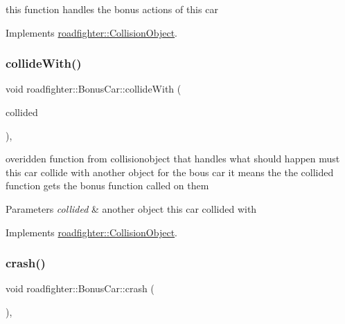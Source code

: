 this function handles the bonus actions of this car 

Implements \hyperlink{classroadfighter_1_1CollisionObject_a157e499c27619ceefd6179a459fafd90}{roadfighter\+::\+Collision\+Object}.

\mbox{\label{classroadfighter_1_1BonusCar_ad1ce65b53e5652eac482a7b00c9a1d51}} 
\subsubsection{\texorpdfstring{collide\+With()}{collideWith()}}
{\footnotesize\ttfamily void roadfighter\+::\+Bonus\+Car\+::collide\+With (\begin{DoxyParamCaption}\item[{std\+::shared\+\_\+ptr$<$ \hyperlink{classroadfighter_1_1CollisionObject}{Collision\+Object} $>$ \&}]{collided }\end{DoxyParamCaption})\hspace{0.3cm}{\ttfamily [override]}, {\ttfamily [virtual]}}

overidden function from collisionobject that handles what should happen must this car collide with another object for the bous car it means the the collided function gets the bonus function called on them 
\begin{DoxyParams}{Parameters}
{\em collided} & another object this car collided with \\
\hline
\end{DoxyParams}


Implements \hyperlink{classroadfighter_1_1CollisionObject_a7eafa2fdc4463788b816fdd9370d28d9}{roadfighter\+::\+Collision\+Object}.

\mbox{\label{classroadfighter_1_1BonusCar_aad0a2a41a1b84c6487c1fc204b5f7cb7}} 
\subsubsection{\texorpdfstring{crash()}{crash()}}
{\footnotesize\ttfamily void roadfighter\+::\+Bonus\+Car\+::crash (\begin{DoxyParamCaption}{ }\end{DoxyParamCaption})\hspace{0.3cm}{\ttfamily [override]}, {\ttfamily [virtual]}}

